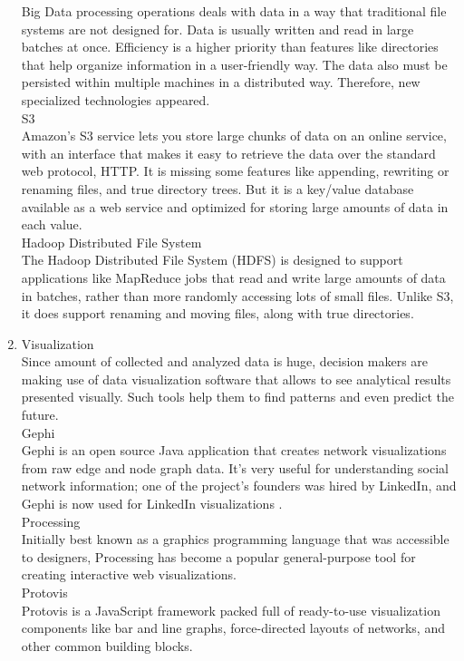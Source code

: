 \documentclass[runningheads]{llncs}
\begin{document}
\begin{enumerate}
Big Data processing operations deals with data in a way that traditional file systems are not designed for. Data is usually written and read in large batches at once. Efficiency is a higher priority than features like directories that help organize information in a user-friendly way. The data also must be persisted within multiple machines in a distributed way. Therefore, new specialized technologies appeared.\\

S3\\

Amazon’s S3 service lets you store large chunks of data on an online service, with an interface that makes it easy to retrieve the data over the standard web protocol, HTTP. It is missing some features like appending, rewriting or renaming files, and true directory trees. But it is a key/value database available as a web service and optimized for storing large amounts of data in each value.\\

Hadoop Distributed File System\\

The Hadoop Distributed File System (HDFS) is designed to support applications like MapReduce jobs that read and write large amounts of data in batches, rather than more randomly accessing lots of small files. Unlike S3, it does support renaming and moving files, along with true directories.\\

\item Visualization\\

Since amount of collected and analyzed data is huge, decision makers are making use of data visualization software that allows to see analytical results presented visually. Such tools help them to find patterns and even predict the future. \\

Gephi\\

Gephi is an open source Java application that creates network visualizations from raw edge and node graph data. It’s very useful for understanding social network information; one of the project’s founders was hired by LinkedIn, and Gephi is now used for LinkedIn visualizations \cite{GLOSSARY}.\\ 

Processing\\

Initially best known as a graphics programming language that was accessible to designers,
Processing has become a popular general-purpose tool for creating interactive
web visualizations.\\

Protovis\\

Protovis is a JavaScript framework packed full of ready-to-use visualization components
like bar and line graphs, force-directed layouts of networks, and other common
building blocks.

\end{enumerate}
\end{document}
